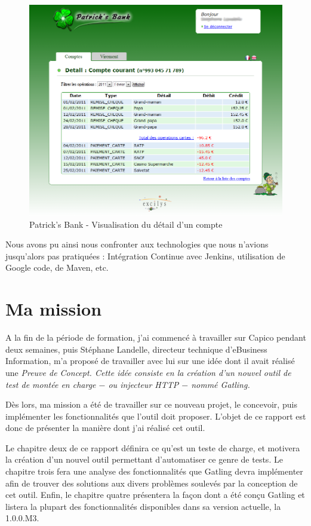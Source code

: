 \begin{figure}[h]
\begin{center}
\includegraphics[width=400pt]{img/patricks_bank.png}
\end{center}
\caption{Patrick's Bank - Visualisation du détail d'un compte}
\label{patricks_bank}
\end{figure}

Nous avons pu ainsi nous confronter aux technologies que nous n'avions jusqu'alors pas pratiquées : Intégration Continue avec Jenkins, utilisation de Google code, de Maven, etc.

\section{Ma mission}
A la fin de la période de formation, j'ai commencé à travailler sur Capico pendant deux semaines, puis Stéphane Landelle, directeur technique d'eBusiness Information, m'a proposé de travailler avec lui sur une idée dont il avait réalisé une \em{Preuve de Concept}. Cette idée consiste en la création d'un nouvel outil de test de montée en charge $-$ ou injecteur HTTP $-$ nommé Gatling\cite{www_gatling}.

Dès lors, ma mission a été de travailler sur ce nouveau projet, le concevoir, puis implémenter les fonctionnalités que l'outil doit proposer. L'objet de ce rapport est donc de présenter la manière dont j'ai réalisé cet outil.

Le chapitre deux de ce rapport définira ce qu'est un teste de charge, et motivera la création d'un nouvel outil permettant d'automatiser ce genre de tests. Le chapitre trois fera une analyse des fonctionnalités que Gatling devra implémenter afin de trouver des solutions aux divers problèmes soulevés par la conception de cet outil. Enfin, le chapitre quatre présentera la façon dont a été conçu Gatling et listera la plupart des fonctionnalités disponibles dans sa version actuelle, la 1.0.0.M3.